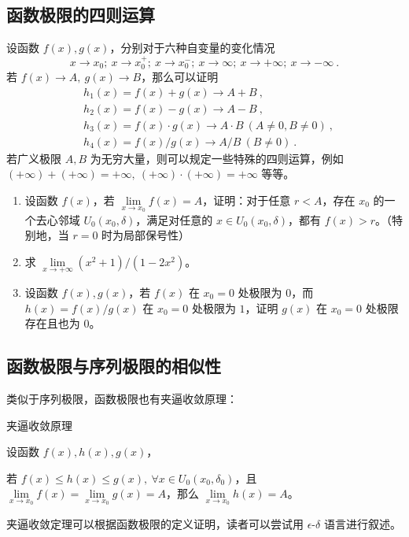 \subsection{函数极限的四则运算}
设函数 $f(x),g(x)$，分别对于六种自变量的变化情况
\begin{equation}
  x\rightarrow x_0;\ x\rightarrow x_0^+;\ x\rightarrow x_0^{-};\ x\rightarrow \infty;\ x\rightarrow +\infty;\ x\rightarrow -\infty~.
\end{equation}
  若 $f(x)\rightarrow A,\ g(x)\rightarrow B$，那么可以证明
\begin{equation}
  \begin{aligned}
  &h_1(x)=f(x)+g(x)\rightarrow A+B~,\\
  &h_2(x)=f(x)-g(x)\rightarrow A-B~,\\
  &h_3(x)=f(x)\cdot g(x)\rightarrow A\cdot B\ (A\neq 0,B\neq 0)~,\\
  &h_4(x)=f(x)/ g(x)\rightarrow A/B\ (B\neq 0)~.
  \end{aligned}
\end{equation}
  若广义极限 $A,B$ 为无穷大量，则可以规定一些特殊的四则运算，例如 $(+\infty)+(+\infty)=+\infty,\ 
  (+\infty)\cdot (+\infty)=+\infty$ 等等。
\begin{exercise}{}
\begin{enumerate}
\item  设函数 $f(x)$，若 $\lim\limits_{x\rightarrow x_0}f(x)=A$，证明：对于任意 $r<A$，存在 $x_0$ 的一个去心邻域 $U_0(x_0,\delta)$，满足对任意的 $x\in U_0(x_0,\delta)$，都有 $f(x)>r$。（特别地，当 $r=0$ 时为局部保号性）
\item 求 $\lim\limits_{x\rightarrow +\infty}(x^2+1)/(1-2x^2)$。
\item 设函数 $f(x),g(x)$，若 $f(x)$ 在 $x_0=0$ 处极限为 $0$，而 $h(x)=f(x)/g(x)$ 在 $x_0=0$ 处极限为 $1$，证明 $g(x)$ 在 $x_0=0$ 处极限存在且也为 $0$。
\end{enumerate}

\end{exercise}

\subsection{函数极限与序列极限的相似性}

类似于序列极限，函数极限也有夹逼收敛原理：
\begin{theorem}{夹逼收敛原理}

  设函数 $f(x),h(x),g(x)$，

  若 $f(x)\le h(x)\le g(x),\ \forall x\in U_0(x_0,\delta_0)$，且 $\lim\limits_{x\rightarrow x_0}f(x)=\lim\limits_{x\rightarrow x_0} g(x)=A$，那么 $\lim\limits_{x\rightarrow x_0}h(x)=A$。
\end{theorem}
夹逼收敛定理可以根据函数极限的定义证明，读者可以尝试用 $\epsilon$-$\delta$ 语言进行叙述。


